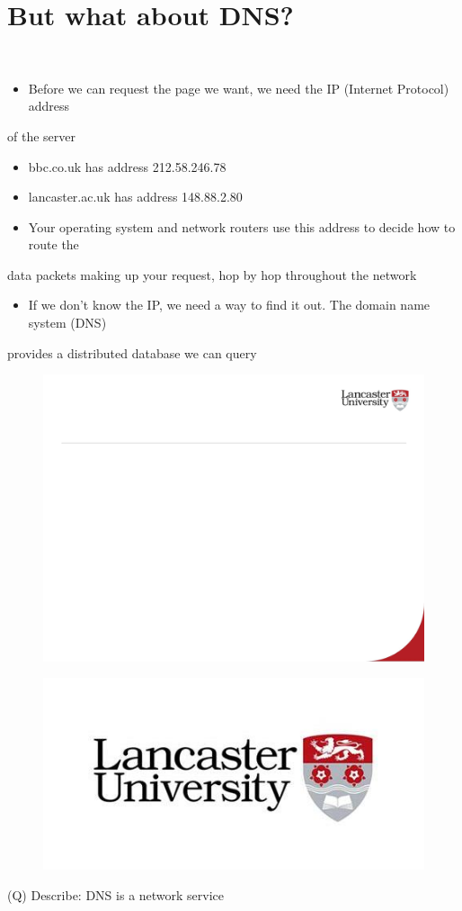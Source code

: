 \documentclass[12pt]{article}
\begin{document}
\section{But what about DNS?}
\\
\begin{itemize}
  \item Before we can request the page we want, we need the IP (Internet Protocol) address 
\end{itemize}
of the server\\
\begin{itemize}
  \item bbc.co.uk has address 212.58.246.78
  \item lancaster.ac.uk has address 148.88.2.80
  \item Your operating system and network routers use this address to decide how to route the 
\end{itemize}
data packets making up your request, hop by hop throughout the network\\
\begin{itemize}
  \item If we don’t know the IP, we need a way to find it out.  The domain name system (DNS) 
\end{itemize}
provides a distributed database we can query\\
\begin{figure}[H]
\includegraphics[width=0.5\linewidth]{page20-image-1.png}
\end{figure}
\begin{figure}[H]
\includegraphics[width=0.5\linewidth]{page20-image-2.png}
\end{figure}
\clearpage
(Q)
Describe: DNS is a network service
\clearpage
\end{document}
